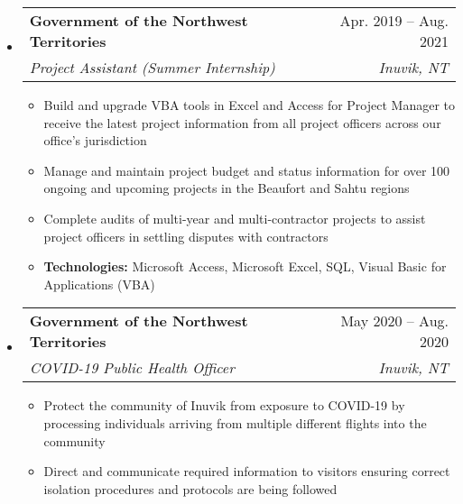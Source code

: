 \documentclass[letterpaper,12pt]{article}[leftmargin=*]
\makeatletter
\def \entryspacing {-0pt}
\newcommand{\resumeEntryStart}{\begin{itemize}[leftmargin=2.5mm]}
\newcommand{\resumeEntryEnd}{\end{itemize}\vspace{\entryspacing}}
\newcommand{\resumeItemListStart}{\begin{itemize}[leftmargin=4.5mm]}
\newcommand{\resumeItemListEnd}{\end{itemize}}
\newcommand{\resumeItem}[1]{
  \item\small{
    {#1 \vspace{-2pt}}
  }
}
\newcommand{\resumeEntryTSDL}[4]{
  \vspace{-1pt}\item[]
    \begin{tabularx}{0.97\textwidth}{X@{\hspace{60pt}}r}
      \textbf{\color{primary}#1} & {\firabook\color{accent}\small#2} \\
      \textit{\color{accent}\small#3} & \textit{\color{accent}\small#4} \\
    \end{tabularx}\vspace{-6pt}
}
\makeatother
\begin{document}
  \resumeEntryStart
    \resumeEntryTSDL
      {Government of the Northwest Territories}{Apr. 2019 -- Aug. 2021}
      {Project Assistant (Summer Internship)}{Inuvik, NT}
    \resumeItemListStart
      \resumeItem {Build and upgrade VBA tools in Excel and Access for Project Manager to receive the latest
      project information from all project officers across our office's jurisdiction}
      \resumeItem {Manage and maintain project budget and status information for over 100 ongoing and upcoming projects in the Beaufort 
      and Sahtu regions}
      \resumeItem {Complete audits of multi-year and multi-contractor projects to assist project officers in settling disputes with contractors}
      \resumeItem{\textbf{Technologies:} Microsoft Access, Microsoft Excel, SQL, Visual Basic for Applications (VBA)}
    \resumeItemListEnd
  \resumeEntryEnd

  \resumeEntryStart
  \resumeEntryTSDL
    {Government of the Northwest Territories}{May 2020 -- Aug. 2020}
    {COVID-19 Public Health Officer}{Inuvik, NT}
  \resumeItemListStart
    \resumeItem {Protect the community of Inuvik from exposure to COVID-19 by processing individuals arriving from multiple different
    flights into the community}
    \resumeItem {Direct and communicate required information to visitors ensuring correct isolation procedures and protocols are 
    being followed}
  \resumeItemListEnd
\resumeEntryEnd


\end{document}
